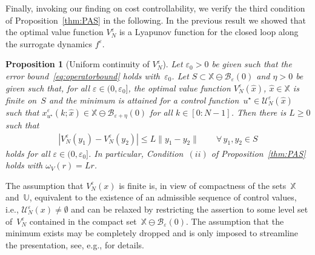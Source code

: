 \documentclass{article}
\numberwithin{equation}{section}
\newtheorem{proposition}[theorem]{Proposition}
\newcommand{\bX}{\mathbb X}
\newcommand{\bU}{\mathbb U}
\begin{document}
	Finally, invoking our finding on cost controllability, we verify the third condition of Proposition~\ref{thm:PAS} in the following. %
	In the previous result we showed that the optimal value function $V_N^\varepsilon$ is a Lyapunov function for the closed loop along the surrogate dynamics $f^\varepsilon$. 
	\begin{proposition}[Uniform continuity of $V^\varepsilon_N$]\label{prop:V_continuity}
		Let $\varepsilon_0 > 0$ be given such that the error bound~\eqref{eq:operatorbound} holds with~$\varepsilon_0$. 
		Let $S \subset \bX \ominus \mathcal{B}_\varepsilon(0)$ and $\eta > 0$ be given such that, for all $\varepsilon \in (0,\varepsilon_0]$, the optimal value function $V^\varepsilon_N(\hat{x})$, $\hat{x} \in \bX$ is finite on~$S$ and the minimum is attained for a control function~$u^\star \in \mathcal{U}_N^\varepsilon(\hat{x})$ such that $x^\varepsilon_{u^\star}(k;\hat{x}) \in \bX \ominus \mathcal{B}_{\varepsilon + \eta}(0)$ for all $k\in [0:N-1]$. Then there is $L \geq 0$ such that
		\begin{align*}
		|V^\varepsilon_N(y_1)-V^\varepsilon_N(y_2)| \leq L\|y_1-y_2\| \qquad\forall\,y_1,y_2 \in S %
		\end{align*}
		holds for all $\varepsilon \in (0,\varepsilon_0]$. In particular, Condition~$(ii)$ of Proposition~\ref{thm:PAS} holds with $\omega_V(r)=Lr$.
	\end{proposition}
	\noindent The assumption that $V_N^\varepsilon(x)$ is finite is, in view of compactness of the sets~$\bX$ and~$\bU$, equivalent to the existence of an admissible sequence of control values, i.e., $\mathcal{U}_N^\varepsilon(x) \neq \emptyset$ %
	and can be relaxed by restricting the assertion to some level set of~$V_N^\varepsilon$ contained in the compact set~$\bX \ominus \mathcal{B}_\varepsilon(0)$. The assumption that the minimum exists may be completely dropped and is only imposed to streamline the presentation, see, e.g., \cite[p.\ 59]{GrunPann17} for details.
\end{document}
